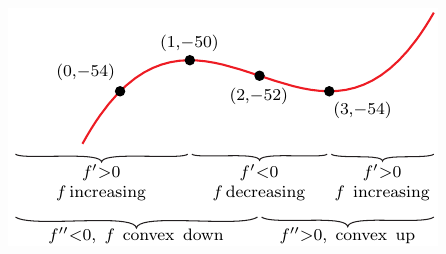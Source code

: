 \begin{eg}[$f(x) = x^3 - 6x^2 + 9x - 54$]
\begin{efig}
\begin{center}
   \includegraphics{sketch4b}
\end{center}
\end{efig}

\end{eg}

